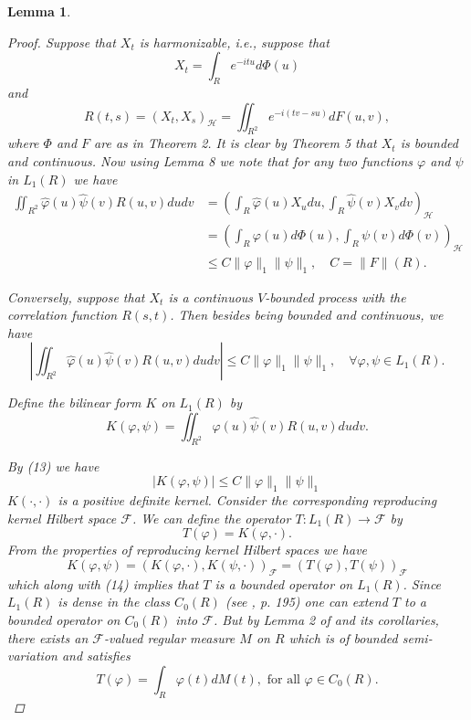 \documentclass{article}
\newtheorem{lemma}[theorem]{Lemma}
\begin{document}
\begin{lemma}
\begin{enumerate}
\begin{proof}
Suppose that $X_t$ is harmonizable, i.e., suppose that
\begin{equation}
X_t = \int_R e^{-itu} d\Phi(u)
\end{equation}
and
\begin{equation}
R(t, s) = (X_t, X_s)_{\mathscr{H}} = \iint_{R^2} e^{-i(tv-su)} dF(u, v),
\end{equation}
where $\Phi$ and $F$ are as in Theorem 2. It is clear by Theorem 5 that $X_t$ is bounded and continuous. Now using Lemma 8 we note that for any two functions $\varphi$ and $\psi$ in $L_1(R)$ we have
\begin{align}
\iint_{R^2} \hat{\varphi}(u)\hat{\psi}(v)R(u, v)du dv &= \left(\int_R \hat{\varphi}(u)X_u du, \int_R \hat{\psi}(v)X_v dv\right)_{\mathscr{H}}\\
&= \left(\int_R \varphi(u)d\Phi(u), \int_R \psi(v)d\Phi(v)\right)_{\mathscr{H}}\\
&\leq C\|\varphi\|_1\|\psi\|_1, \quad C = \|F\|(R).
\end{align}

Conversely, suppose that $X_t$ is a continuous $V$-bounded process with the correlation function $R(s, t)$. Then besides being bounded and continuous, we have
\begin{equation}
\left|\iint_{R^2} \hat{\varphi}(u)\hat{\psi}(v)R(u, v)du dv\right| \leq C \|\varphi\|_1\|\psi\|_1, \quad \forall \varphi, \psi \in L_1(R).
\end{equation}

Define the bilinear form $K$ on $L_1(R)$ by
\begin{equation}
K(\varphi, \psi) = \iint_{R^2} \hat{\varphi}(u)\hat{\psi}(v)R(u, v)du dv.
\end{equation}

By (13) we have
\begin{equation}
|K(\varphi, \psi)| \leq C \|\varphi\|_1\|\psi\|_1
\end{equation}
$K(\cdot,\cdot)$ is a positive definite kernel. Consider the corresponding reproducing kernel Hilbert space $\mathscr{F}$. We can define the operator $T : L_1(R) \to \mathscr{F}$ by
\begin{equation}
T(\varphi) = K(\varphi, \cdot).
\end{equation}
From the properties of reproducing kernel Hilbert spaces we have
\begin{equation}
K(\varphi, \psi) = (K(\varphi, \cdot), K(\psi, \cdot))_{\mathscr{F}} = (T(\varphi), T(\psi))_{\mathscr{F}}
\end{equation}
which along with (14) implies that $T$ is a bounded operator on $L_1(R)$. Since $L_1(R)$ is dense in the class $C_0(R)$ (see \cite{rudin}, p. 195) one can extend $T$ to a bounded operator on $C_0(R)$ into $\mathscr{F}$. But by Lemma 2 of \cite{kluvanek} and its corollaries, there exists an $\mathscr{F}$-valued regular measure $M$ on $R$ which is of bounded semi-variation and satisfies
\begin{equation}
T(\varphi) = \int_R \varphi(t)dM(t), \text{ for all } \varphi \in C_0(R).
\end{equation}


\end{proof}
\end{enumerate}
\end{lemma}
\end{document}
